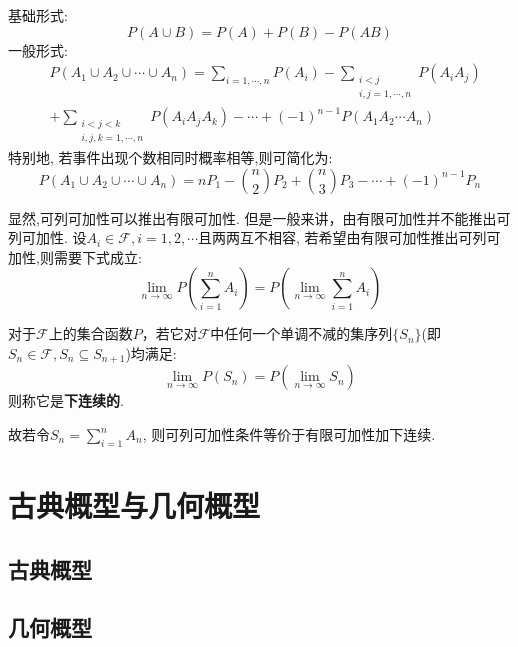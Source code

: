 \begin{corollary}[加法公式]
    基础形式:
    \[ P(A \cup B) = P(A) + P(B) - P(AB) \]
    一般形式:
    \begin{align*}
         & P\left(A_{1} \cup A_{2} \cup \cdots \cup A_{n}\right) =  \sum_{i=1, \cdots, n} P\left(A_{i}\right)-\sum_{\substack{i<j \\
        i, j=1, \cdots, n}} P\left(A_{i} A_{j}\right)                                                                             \\
         & +\sum_{\substack{i<j<k                                                                                                 \\i, j, k=1, \cdots, n}} P\left(A_{i} A_{j} A_{k}\right)-\cdots+(-1)^{n-1} P\left(A_{1} A_{2} \cdots A_{n}\right)
    \end{align*}
    特别地, 若事件出现个数相同时概率相等,则可简化为:
    \[ P\left(A_{1} \cup A_{2} \cup \cdots \cup A_{n}\right)=n P_{1} - \binom{n}{2} P_{2} + \binom{n}{3} P_{3}- \cdots+(-1)^{n-1} P_{n} \]
\end{corollary}

显然,可列可加性可以推出有限可加性. 但是一般来讲，由有限可加性并不能推出可列可加性. 设$A_i \in \mathscr{F}, i=1,2,\cdots $且两两互不相容, 若希望由有限可加性推出可列可加性,则需要下式成立:
\[ \lim_{n \to \infty}P(\sum_{i=1}^n A_i) =P(\lim_{n \to \infty}\sum_{i=1}^{n} A_i) \]

\begin{definition}
    对于$\mathscr{F}$上的集合函数$P$，若它对$\mathscr{F}$中任何一个单调不减的集序列$\{ S_n \}$(即$ S_n \in \mathscr{F}, S_n \subseteq  S_{n+1} $)均满足:
    \[ \lim_{n \to \infty}P(S_n) =P(\lim_{n \to \infty} S_n) \]
    则称它是\textbf{下连续的}.
\end{definition}

故若令$S_n = \sum_{i=1}^n A_n$, 则可列可加性条件等价于有限可加性加下连续.

\section{古典概型与几何概型}

\subsection{古典概型}

\subsection{几何概型}

